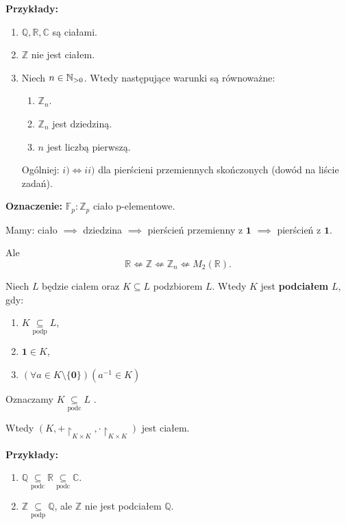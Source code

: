 \textbf{Przykłady:}
\begin{enumerate}[label=\arabic*)]
	\item $\mathbb{Q}, \mathbb{R} , \mathbb{C}  $ są ciałami.
	\item $\mathbb{Z} $ nie jest ciałem.
	\item Niech $n\in \mathbb{N}_{>0}$. Wtedy następujące warunki są równoważne:
		\begin{enumerate}[label=\roman*)]
			\item $\mathbb{Z}_{n}$.
			\item $\mathbb{Z} _{n} $ jest dziedziną.
			\item $n$ jest liczbą pierwszą.
		\end{enumerate}
		\noindent Ogólniej: $i)\iff ii)$ dla pierścieni przemiennych skończonych (dowód na liście zadań).
\end{enumerate}
\noindent \textbf{Oznaczenie: } $\mathbb{F}_{p}: \mathbb{Z}_{p}$ ciało p-elementowe. 

\begin{remark}
	Mamy:
	ciało $\implies$ dziedzina $\implies$ pierścień przemienny z $\mathbf{1}$ $\implies$ pierścień z $\mathbf{1}$.

	Ale
	\[
	\mathbb{R} \nLeftarrow \mathbb{Z} \nLeftarrow \mathbb{Z} _{n} \nLeftarrow M_{2}\left( \mathbb{R}  \right) 
	.\] 
\end{remark} 
\begin{definition}[Podciało.]
	Niech $L$ będzie ciałem oraz $K\subseteq L$ podzbiorem $L$. Wtedy $K$ jest \textbf{podciałem} $L$, gdy:
	\begin{enumerate}[label=\arabic*)]
		\item $K\underset{\scriptscriptstyle\text{podp}}{\subseteq} L$,
		\item $\mathbf{1} \in K$,
		\item $\left(\forall a \in K\setminus \{\mathbf{0}\}  \right) \left( a^{-1}\in K \right) $
	\end{enumerate}
\noindent Oznaczamy $K\underset{\scriptscriptstyle\text{podc}}{\subseteq} L$ .
\end{definition} 
\begin{remark}
	Wtedy $\left( K, +\restriction_{\scriptscriptstyle K\times K}, \cdot\restriction_{\scriptscriptstyle K\times K} \right) $ jest ciałem.
\end{remark} 
\noindent \textbf{Przykłady:}
\begin{enumerate}[label=\arabic*)]
	\item $\mathbb{Q} \underset{\scriptscriptstyle\text{podc}}{\subseteq} \mathbb{R} \underset{\scriptscriptstyle\text{podc}}{\subseteq} \mathbb{C} $.
	\item $\mathbb{Z} \underset{\scriptscriptstyle\text{podp}}{\subseteq} \mathbb{Q} $, ale  $\mathbb{Z} $ nie jest podciałem $\mathbb{Q} $.
\end{enumerate}
